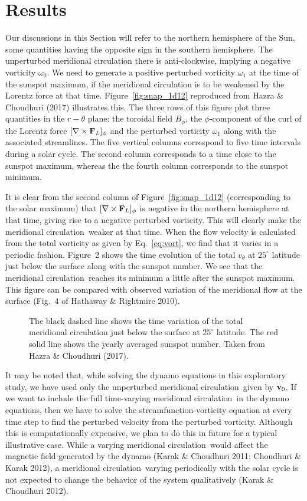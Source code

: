 \documentclass{iau}
\def\MC{meridional circulation}
\def\vb{{\bf v}}
\begin{document}
\section{Results}

Our discussions in this Section will refer to the northern hemisphere of the Sun, some quantities having
the opposite sign in the southern hemisphere.
The unperturbed meridional circulation there is anti-clockwise, implying
a negative vorticity $\omega_0$. We need to generate a positive perturbed vorticity
$\omega_1$ at the time of the sunspot maximum, if the meridional circulation is to be weakened by the Lorentz
force at that time. Figure~\ref{fig:snap_1d12} reproduced from Hazra \& Choudhuri (2017) illustrates this.  The three rows
of this figure plot three quantities in the $r-\theta$ plane: the toroidal field $B_\phi$, the 
$\phi$-component of the curl of the Lorentz force $[\nabla \times {\bf F}_L]_{\phi}$ and the perturbed
vorticity $\omega_1$ along with the associated streamlines. The five vertical columns correspond to five
time intervals during a solar cycle.  The second column corresponds to a time close to the sunspot
maximum, whereas the the fourth column corresponds to the sunspot minimum. 

It is clear from the second column of Figure~\ref{fig:snap_1d12} (corresponding to the solar 
maximum) that $[\nabla \times {\bf F}_L]_{\phi}$ is negative in the northern hemisphere at
that time, giving rise to a negative perturbed vorticity. This will clearly make the 
\MC\ weaker at that time.  When the flow velocity is calculated from the total vorticity
as given by Eq.~\ref{eq:vort}, we find that it varies in a periodic fashion. Figure~2 shows
the time evolution of the total $v_{\theta}$ at $25^{\circ}$ latitude just below the surface
along with the sunspot number.  We see that the \MC\ reaches its minimum a little after the
sunspot maximum. This figure can be compared with observed variation of the meridional flow at the 
surface (Fig.~4 of Hathaway \& Rightmire 2010).

\begin{figure}[!h]
\caption{The black dashed line shows the time variation of the total meridional circulation just below the surface at $25^{\circ}$ latitude. The red solid line shows the yearly averaged sunspot number. Taken from Hazra \& Choudhuri (2017).}
\label{fig:tot_mc}
\end{figure}

It may be noted that, while solving the dynamo equations in this exploratory study, we have
used only the unperturbed \MC\ given by $\vb_0$. If we want to include the full time-varying \MC\
in the dynamo equations, then we have to solve the streamfunction-vorticity equation at every time
step to find the perturbed velocity from the perturbed vorticity. Although this is computationally expensive,
we plan to do this in future for a typical illustrative case. While a varying \MC\ would affect the
magnetic field generated by the dynamo (Karak \& Choudhuri 2011; Choudhuri \& Karak 2012), a \MC\
varying periodically with the solar cycle is not expected to change the behavior of the system
qualitatively (Karak \& Choudhuri 2012).
\end{document}
